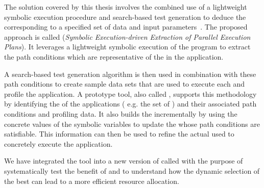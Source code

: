 



The solution covered by this thesis involves the combined use of a lightweight symbolic execution procedure and search-based test generation to deduce the \plan corresponding to a specified set of data and input parameters~\cite{Baresi-Quattrocchi-Denaro:2019}. The proposed approach is called \dSymb (\textit{Symbolic Execution-driven Extraction of Parallel Execution Plans}). It leverages a lightweight symbolic execution of the program to extract the path conditions which are representative of the \plans in the application. 

A search-based test generation algorithm is then used in combination with these path conditions to create sample data sets that are used to execute each \plan and profile the application. A prototype tool, also called \dSymb, supports this methodology by identifying the \model of the applications ( e.g. the set of \plans) and their associated path conditions and profiling data. It also builds the \model incrementally by using the concrete values of the symbolic variables to update the \plans whose path conditions are satisfiable. This information can then be used to refine the actual \plan used to concretely execute the application. 

We have integrated the tool into a new version of \cSpark called \tool with the purpose of systematically test the benefit of \dSymb and to understand how the dynamic selection of the best \plan can lead to a more efficient resource allocation. 

